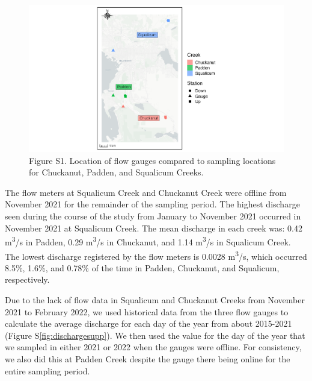 \documentclass[
]{article}
\begin{document}
\begin{figure}
\centering
\includegraphics{../Output/SupplementalFigures/map_gauges.png}
\caption{Figure S1. Location of flow gauges compared to sampling
locations for Chuckanut, Padden, and Squalicum
Creeks.\label{fig:gaugemap}}
\end{figure}

The flow meters at Squalicum Creek and Chuckanut Creek were offline from
November 2021 for the remainder of the sampling period. The highest
discharge seen during the course of the study from January to November
2021 occurred in November 2021 at Squalicum Creek. The mean discharge in
each creek was: 0.42 m\textsuperscript{3}/s in Padden, 0.29
m\textsuperscript{3}/s in Chuckanut, and 1.14 m\textsuperscript{3}/s in
Squalicum Creek. The lowest discharge registered by the flow meters is
0.0028 m\textsuperscript{3}/s, which occurred 8.5\%, 1.6\%, and 0.78\%
of the time in Padden, Chuckanut, and Squalicum, respectively.

Due to the lack of flow data in Squalicum and Chuckanut Creeks from
November 2021 to February 2022, we used historical data from the three
flow gauges to calculate the average discharge for each day of the year
from about 2015-2021 (Figure S\ref{fig:dischargesupp}). We then used the
value for the day of the year that we sampled in either 2021 or 2022
when the gauges were offline. For consistency, we also did this at
Padden Creek despite the gauge there being online for the entire
sampling period.
\end{document}
